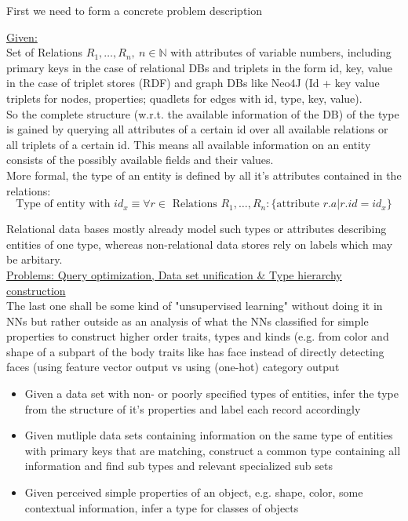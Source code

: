 \begin{Huge}
First we need to form a concrete problem description
\end{Huge} 

\underline{Given: }\\
Set of Relations $R_1, \dots, R_n, \ n \in \mathbb{N}$ with attributes of variable numbers, including primary keys in the case of relational DBs and triplets in the form id, key, value in the case of triplet stores (RDF) and graph DBs like Neo4J (Id + key value triplets for nodes, properties; quadlets for edges with id, type, key, value). \\
So the complete structure (w.r.t. the available information of the DB) of the type is gained by querying all attributes of a certain id over all available relations or all triplets of a certain id. This means all available information on an entity consists of the possibly available fields and their values. \\
More formal, the type of an entity is defined by all it's attributes contained in the relations: 
\[\text{Type of entity with } id_x \equiv \forall r \in \text{ Relations } R_1, \dots, R_n: \{ \text{attribute } r.a | r.id = id_x \} \]

Relational data bases mostly already model such types or attributes describing entities of one type, whereas non-relational data stores rely on labels which may be arbitary. \\

\underline{Problems: Query optimization, Data set unification \& Type hierarchy construction} \\
The last one shall be some kind of "unsupervised learning" without doing it in NNs but rather outside as an analysis of what the NNs classified for simple properties to construct higher order traits, types and kinds (e.g. from color and shape of a subpart of the body traits like has face instead of directly detecting faces (using feature vector output vs using (one-hot) category output
\begin{itemize}
    \item Given a data set with non- or poorly specified types of entities, infer the type from the structure of it's properties and label each record accordingly
    \item Given mutliple data sets containing information on the same type of entities with primary keys that are matching, construct a common type containing all information and find sub types and relevant specialized sub sets
    \item Given perceived simple properties of an object, e.g. shape, color, some contextual information, infer a type for classes of objects
\end{itemize}

